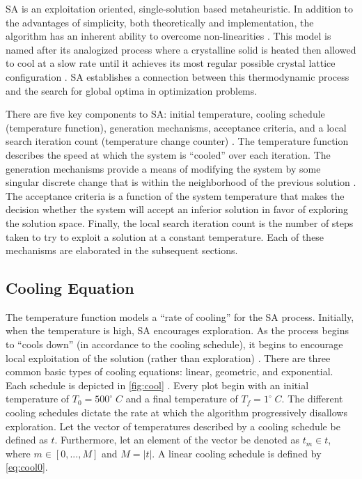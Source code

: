 \documentclass[11pt,a4paper,final]{article}
\begin{document}
SA is an exploitation oriented, single-solution based metaheuristic. In addition to the advantages of simplicity, both
theoretically and implementation, the algorithm has an inherent ability to overcome non-linearities
\cite{gendreau-2018-handb-metah,radosavljevic-2018-metah-optim}. This model is named after its analogized process
where a crystalline solid is heated then allowed to cool at a slow rate until it achieves its most regular possible
crystal lattice configuration \cite{henderson-1989-theor-pract}. SA establishes a connection between this thermodynamic
process and the search for global optima in optimization problems.

There are five key components to SA: initial temperature, cooling schedule (temperature function), generation
mechanisms, acceptance criteria, and a local search iteration count (temperature change counter)
\cite{keller-2019-multi-objec}. The temperature function describes the speed at which the system is ``cooled'' over each
iteration. The generation mechanisms provide a means of modifying the system by some singular discrete change that is
within the neighborhood of the previous solution \cite{gendreau-2018-handb-metah}. The acceptance criteria is a
function of the system temperature that makes the decision whether the system will accept an inferior solution in favor
of exploring the solution space. Finally, the local search iteration count is the number of steps taken to try to
exploit a solution at a constant temperature. Each of these mechanisms are elaborated in the subsequent sections.

\subsection{Cooling Equation}
\label{cooling-equation-experimental}
The temperature function models a ``rate of cooling'' for the SA process. Initially, when the temperature is high, SA
encourages exploration. As the process begins to ``cools down'' (in accordance to the cooling schedule), it begins to
encourage local exploitation of the solution (rather than exploration)
\cite{rutenbar-1989-simul-anneal-algor,henderson-1989-theor-pract}. There are three common basic types of cooling
equations: linear, geometric, and exponential. Each schedule is depicted in \ref{fig:cool} \cite{keller-2019-multi-objec}.
Every plot begin with an initial temperature of \(T_0 = 500^\circ\; C\) and a final temperature of \(T_f = 1^\circ\; C\). The
different cooling schedules dictate the rate at which the algorithm progressively disallows exploration. Let the vector
of temperatures described by a cooling schedule be defined as \(t\). Furthermore, let an element of the vector be denoted
as \(t_m \in t\), where \(m \in [0,...,M]\) and \(M = \lvert t \rvert\). A linear cooling schedule is defined by \ref{eq:cool0}.
\end{document}
